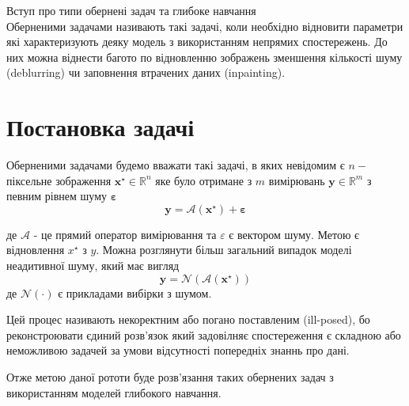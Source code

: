 \documentclass[14pt,a4paper]{extarticle}
\newcounter{e}
\numberwithin{equation}{section}
\numberwithin{figure}{section}
\begin{document}
	Вступ про типи обернені задач та глибоке навчання
	\\
	
	Оберненими задачами називають такі задачі, коли необхідно відновити параметри які характеризують деяку модель з використанням непрямих спостережень. До них можна віднести багото по відновленню зображень зменшення кількості шуму (deblurring) чи заповнення втрачених даних (inpainting).

	
	\newpage
	\thispagestyle{empty}
	\section{Постановка задачі} 
	Оберненими задачами будемо вважати такі задачі, в яких невідомим є $n-$ піксельне зображення $\boldsymbol{x}^{\star} \in \mathbb{R}^{n}$ яке було отримане з $m$ вимірювань $\boldsymbol{y} \in \mathbb{R}^{m}$ з певним рівнем шуму $\boldsymbol{\varepsilon}$
	$$
	\boldsymbol{y}=\mathcal{A}\left(\boldsymbol{x}^{\star}\right)+\boldsymbol{\varepsilon}
	$$
	
	де $\mathcal{A}$ - це прямий оператор вимірювання та $\varepsilon$ є вектором шуму. Метою є відновлення $x^{\star}$ з $y$. Можна розглянути більш загальний випадок моделі неадитивної шуму, який має вигляд 
	$$
	\boldsymbol{y}=\mathcal{N}\left(\mathcal{A}\left(\boldsymbol{x}^{\star}\right)\right)
	$$
	де $\mathcal{N}(\cdot)$ є прикладами вибірки з шумом.

	Цей процес називають некоректним або погано поставленим (ill-posed), бо реконстроювати єдиний розв'язок який задовілняє спостереження є складною або неможливою задачей за умови відсутності попередніх знаннь про дані.

	Отже метою даної рототи буде розв'язання таких обернених задач з використанням моделей глибокого навчання.

	

		
		
\end{document}
